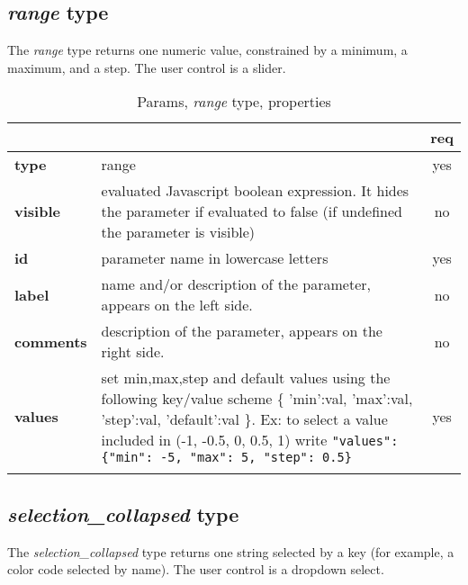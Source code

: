 \subsection{ \emph{range} type}

The \emph{range} type returns one numeric value, constrained 
by a minimum, a maximum, and a step. The user control is a slider.


\begin{longtable}{|>{\bf}L{\linewidth}|L{\linewidth}|c|}
\hline
      &  & {\bf req} 
\tabularnewline \hline \hline
 type  & range       & yes \\ \hline
 visible  & evaluated Javascript boolean expression. It hides the parameter if
            evaluated to false (if undefined the parameter is visible)& no \\ \hline
 id     & parameter name in lowercase letters  & yes \\ \hline
 label  & name and/or description of the parameter, appears on the left side. & no
                      \\ \hline
 comments & description of the parameter, appears on the right side. & no
                      \\ \hline
 values & set min,max,step and default values using the following key/value 
scheme \{ 'min':val, 'max':val, 'step':val, 'default':val \}. 
Ex: to select a value included in (-1, -0.5, 0, 0.5, 1) write \texttt{"values": \{"min": -5, "max": 5, "step": 0.5\}}  & yes
                      \\ \hline
\caption{Params, \emph{range} type, properties}
\end{longtable}


\subsection{ \emph{selection\_collapsed} type}

The \emph{selection\_collapsed} type returns one string selected by a key (for example, 
a color code selected by name). The user control is a dropdown select.

